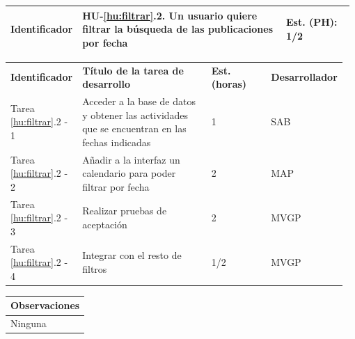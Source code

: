 \documentclass[11pt]{article}
\begin{document}
\begin{longtable}{p{0.18\linewidth}|p{0.6\linewidth}|p{0.2\linewidth}}
  \rowcolor{LightCyan}
  \textbf{Identificador} & \textbf{HU-\ref{hu:filtrar}.2}. Un usuario quiere filtrar la búsqueda de las publicaciones por fecha & \textbf{Est. (PH):} 1/2 \\
  \bottomrule
\end{longtable}
\vspace{-0.5cm}
\begin{longtable}{p{0.18\linewidth}|p{0.4\linewidth}|p{0.18\linewidth}|p{0.2\linewidth}}
  \toprule
  \textbf{Identificador} & \textbf{Título de la tarea de desarrollo} & \textbf{Est. (horas)} & \textbf{Desarrollador} \\
  Tarea \ref{hu:filtrar}.2 - 1 & Acceder a la base de datos y obtener las actividades que se encuentran en las fechas indicadas & 1 & SAB\\
  Tarea \ref{hu:filtrar}.2 - 2 & Añadir a la interfaz un calendario para poder filtrar por fecha & 2 & MAP\\
  Tarea \ref{hu:filtrar}.2 - 3 & Realizar pruebas de aceptación & 2 & MVGP\\
  Tarea \ref{hu:filtrar}.2 - 4 & Integrar con el resto de filtros & 1/2 & MVGP\\
  \bottomrule
\end{longtable}
\vspace{-0.5cm}
\begin{longtable}{p{1.028\linewidth}}
  \textbf{Observaciones}\\
  \midrule
  Ninguna\\
  \bottomrule
\end{longtable}
\end{document}
